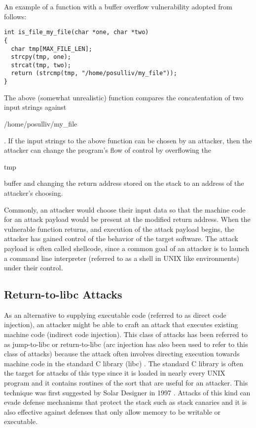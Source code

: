 An example of a function with a buffer overflow vulnerability adopted from \cite{erlingsson-07} follows:

\begin{mylisting}
\begin{verbatim}
int is_file_my_file(char *one, char *two)
{
  char tmp[MAX_FILE_LEN];
  strcpy(tmp, one);
  strcat(tmp, two);
  return (strcmp(tmp, "/home/posulliv/my_file"));
}
\end{verbatim}
\end{mylisting}

The above (somewhat unrealistic) function compares the concatentation of two input strings against
\begin{em}/home/posulliv/my\_file\end{em}. If the input strings to the above function can be chosen by an
attacker, then the attacker can change the program's flow of control by overflowing the
\begin{em}tmp\end{em} buffer and changing the return address stored on the stack to an address of
the attacker's choosing.

Commonly, an attacker would choose their input data so that the machine code for an attack payload
would be present at the modified return address. When the vulnerable function returns, and execution
of the attack payload begins, the attacker has gained control of the behavior of the target
software. The attack payload is often called shellcode, since a common goal of an attacker is to
launch a command line interpreter (referred to as a shell in UNIX like environments) under their
control.

\subsection{Return-to-libc Attacks}

As an alternative to supplying executable code (referred to as direct code injection), an attacker
might be able to craft an attack that executes existing machine code (indirect code injection). This
class of attacks has been referred to as jump-to-libc or return-to-libc (arc injection \cite{cowan2000buffer} has
also been used to refer to this class of attacks) because the attack often involves directing
execution towards machine code in the standard C library (libc) \cite{cowan2000buffer}. The standard C library is
often the target for attacks of this type since it is loaded in nearly every UNIX program and it
contains routines of the sort that are useful for an attacker. This technique was first suggested by
Solar Designer in 1997 \cite{designer1997return}. Attacks of this kind can evade defense mechanisms that protect the
stack such as stack canaries and it is also effective against defenses that only allow memory to be
writable or executable.

